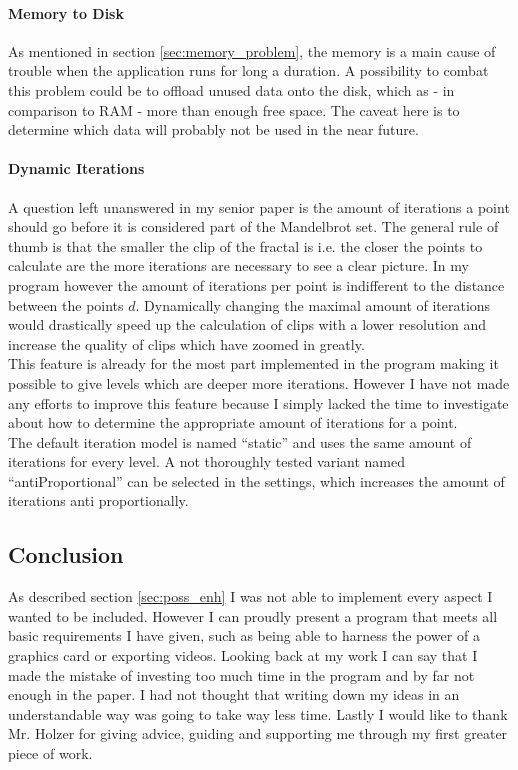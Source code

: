 \documentclass[12pt,a4paper,titlepage]{article}
\begin{document}
	\paragraph{Memory to Disk}
	As mentioned in section \ref{sec:memory_problem}, the memory is a main cause of trouble when the application runs for long a duration. A possibility to combat this problem could be to offload unused data onto the disk, which as - in comparison to RAM - more than enough free space. The caveat here is to determine which data will probably not be used in the near future.
	\paragraph{Dynamic Iterations}
	A question left unanswered in my senior paper is the amount of iterations a point should go before it is considered part of the Mandelbrot set. The general rule of thumb is that the smaller the clip of the fractal is i.e. the closer the points to calculate are the more iterations are necessary to see a clear picture. In my program however the amount of iterations per point is indifferent to the distance between the points \(d\). Dynamically changing the maximal amount of iterations would drastically speed up the calculation of clips with a lower resolution and increase the quality of clips which have zoomed in greatly.\\
	This feature is already for the most part implemented in the program making it possible to give levels which are deeper more iterations. However I have not made any efforts to improve this feature because I simply lacked the time to investigate about how to determine the appropriate amount of iterations for a point.\\
	The default iteration model is named ``static'' and uses the same amount of iterations for every level. A not thoroughly tested variant named ``antiProportional'' can be selected in the settings, which increases the amount of iterations anti proportionally.
	\subsection{Conclusion}
	As described section \ref{sec:poss_enh} I was not able to implement every aspect I wanted to be included. However I can proudly present a program that meets all basic requirements I have given, such as being able to harness the power of a graphics card or exporting videos. Looking back at my work I can say that I made the mistake of investing too much time in the program and by far not enough in the paper. I had not thought that writing down my ideas in an understandable way was going to take way less time. Lastly I would like to thank Mr. Holzer for giving advice, guiding and supporting me through my first greater piece of work.
	\printbibliography
	
\end{document}
